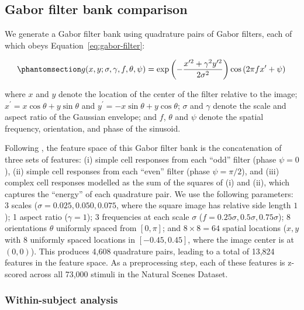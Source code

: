 \documentclass[10pt]{article}
\begin{document}
\subsection{Gabor filter bank comparison}\label{gabor-filter-bank-comparison}

We generate a Gabor filter bank using quadrature pairs of Gabor filters, each of which obeys Equation~\ref{eq:gabor-filter}:

\begin{equation}\phantomsection\label{eq:gabor-filter}{
g(x, y; \sigma, \gamma, f, \theta, \psi) = \exp{\left(- \frac{x^{\prime 2} + \gamma^2 y^{\prime 2}}{2 \sigma^2}\right)} \cos{\left(2 \pi f x^\prime + \psi\right)}\,
}\end{equation}

where \(x\) and \(y\) denote the location of the center of the filter relative to the image; \(x^\prime = x \cos \theta + y \sin \theta\) and \(y^\prime = - x \sin \theta + y \cos \theta\); \(\sigma\) and \(\gamma\) denote the scale and aspect ratio of the Gaussian envelope; and \(f\), \(\theta\) and \(\psi\) denote the spatial frequency, orientation, and phase of the sinusoid.

Following \textcite{Cadena2019}, the feature space of this Gabor filter bank is the concatenation of three sets of features: (i) simple cell responses from each ``odd'' filter (phase \(\psi = 0\)), (ii) simple cell responses from each ``even'' filter (phase \(\psi = \pi / 2\)), and (iii) complex cell responses modelled as the sum of the squares of (i) and (ii), which captures the ``energy'' of each quadrature pair. We use the following parameters: 3 scales (\(\sigma = 0.025, 0.050, 0.075\), where the square image has relative side length \(1\)); 1 aspect ratio (\(\gamma = 1\)); 3 frequencies at each scale \(\sigma\) (\(f = 0.25 \sigma, 0.5 \sigma, 0.75 \sigma\)); 8 orientations \(\theta\) uniformly spaced from \([0, \pi]\); and \(8 \times 8 = 64\) spatial locations (\(x, y\) with 8 uniformly spaced locations in \([-0.45, 0.45]\), where the image center is at \((0, 0)\)). This produces 4,608 quadrature pairs, leading to a total of 13,824 features in the feature space. As a preprocessing step, each of these features is z-scored across all 73,000 stimuli in the Natural Scenes Dataset.

\subsubsection{Within-subject analysis}\label{within-subject-analysis}
\end{document}
